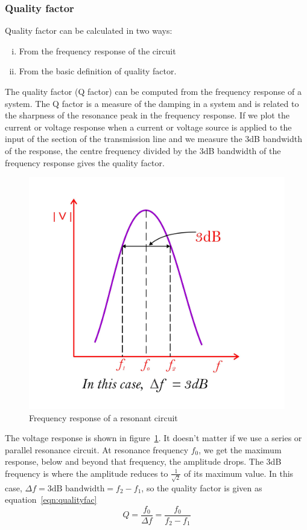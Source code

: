 \subsubsection{Quality factor}
Quality factor can be calculated in two ways:
\begin{enumerate}[(i)]
\item From the frequency response of the circuit
\item From the basic definition of quality factor.
\end{enumerate}
The quality factor (Q factor) can be computed from the frequency response of a system. The Q factor is a measure of the damping in a system and is related to the sharpness of the resonance peak in the frequency response. If we plot the current or voltage response when a current or voltage source is applied to the input of the section of the transmission line and we measure the 3dB bandwidth of the response, the centre frequency divided by the 3dB bandwidth of the frequency response gives the quality factor.
\begin{figure}[h]
\centering
\includegraphics[width=0.8\linewidth]{./graphics/fig2}
\caption{Frequency response of a resonant circuit}
\label{fig:fig2}
\end{figure}

The voltage response is shown in figure~\ref{fig:fig2}. It doesn't matter if we use a series or parallel resonance circuit. At resonance frequency $ f_0 $, we get the maximum response, below and beyond that frequency, the amplitude drops. The 3dB frequency is where the amplitude reduces to $ \frac{1}{\sqrt{2}} $ of its maximum value. In this case, $ \Delta f=3\text{dB bandwidth} =f_{2}-f_{1} $, so the quality factor is given as equation~\eqref{eqn:qualityfac}
\begin{equation}
Q=\frac{f_0}{\Delta f}=\frac{f_0}{f_{2}-f_{1}}
\label{eqn:qualityfac}
\end{equation} 

